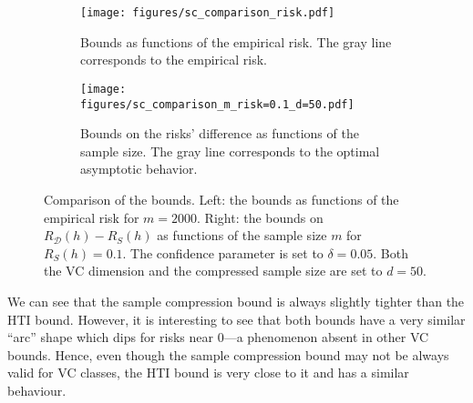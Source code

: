 \documentclass[twoside,11pt]{article}
\newcommand{\D}{\mathcal{D}}
\begin{document}
\begin{figure}[h]
\centering
\begin{subfigure}[t]{0.485\textwidth}
    \centering
    \texttt{[image: figures/sc\_comparison\_risk.pdf]}
    \caption{Bounds as functions of the empirical risk. The gray line corresponds to the empirical risk.}
    \label{fig:sc_comp_risk}
\end{subfigure}\hfill
\begin{subfigure}[t]{0.485\textwidth}
    \centering
    \texttt{[image: figures/sc\_comparison\_m\_risk=0.1\_d=50.pdf]}
    \caption{Bounds on the risks' difference as functions of the sample size. The gray line corresponds to the optimal asymptotic behavior.}
    \label{fig:sc_comp_m}
\end{subfigure}
\caption{Comparison of the bounds.
Left: the bounds as functions of the empirical risk for $m=2000$. Right: the bounds on $R_\D(h) - R_S(h)$ as functions of the sample size $m$ for $R_S(h) = 0.1$.
The confidence parameter is set to $\delta=0.05$. Both the VC dimension and the compressed sample size are set to $d=50$.}
\label{fig:sc_comparison}
\end{figure}


We can see that the sample compression bound is always slightly tighter than the HTI bound.
However, it is interesting to see that both bounds have a very similar ``arc'' shape which dips for risks near 0---a phenomenon absent in other VC bounds.
Hence, even though the sample compression bound may not be always valid for VC classes, the HTI bound is very close to it and has a similar behaviour.




\vskip 0.2in

\end{document}
